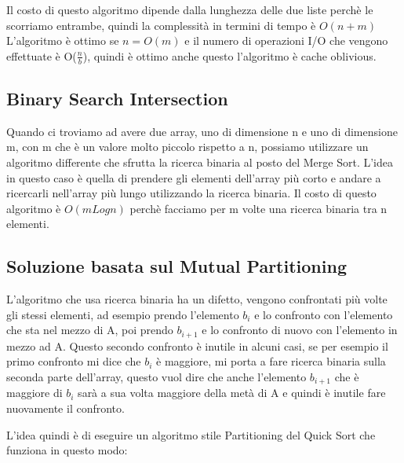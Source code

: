 \documentclass[14pt]{extreport}
\begin{document}
Il costo di questo algoritmo dipende dalla lunghezza delle due liste perchè le scorriamo entrambe, quindi la complessità in termini di tempo è $O(n+m)$
L'algoritmo è ottimo se $n=O(m)$ e il numero di operazioni I/O che vengono effettuate è O($\frac{n}{b}$), quindi è ottimo anche questo l'algoritmo è cache oblivious.

\subsection{Binary Search Intersection}

Quando ci troviamo ad avere due array, uno di dimensione n e uno di dimensione m, con m che è un valore molto piccolo rispetto a n, possiamo utilizzare un algoritmo differente che sfrutta la ricerca binaria al posto del Merge Sort.
L'idea in questo caso è quella di prendere gli elementi dell'array più corto e andare a ricercarli nell'array più lungo utilizzando la ricerca binaria.
Il costo di questo algoritmo è $O(mLog n)$ perchè facciamo per m volte una ricerca binaria tra n elementi.

\subsection{Soluzione basata sul Mutual Partitioning}

L'algoritmo che usa ricerca binaria ha un difetto, vengono confrontati più volte gli stessi elementi, ad esempio prendo l'elemento $b_i$ e lo confronto con l'elemento che sta nel mezzo di A, poi prendo $b_{i+1}$ e lo confronto di nuovo con l'elemento in mezzo ad A. Questo secondo confronto è inutile in alcuni casi, se per esempio il primo confronto mi dice che $b_i$ è maggiore, mi porta a fare ricerca binaria sulla seconda parte dell'array, questo vuol dire che anche l'elemento $b_{i+1}$ che è maggiore di $b_{i}$ sarà a sua volta maggiore della metà di A e quindi è inutile fare nuovamente il confronto.

L'idea quindi è di eseguire un algoritmo stile Partitioning del Quick Sort che funziona in questo modo:
\end{document}
